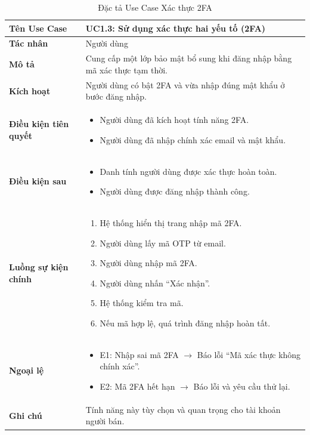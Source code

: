 \begin{table}[H]
\centering
\begin{tabularx}{\textwidth}{|l|X|}
\hline
\textbf{Tên Use Case} & \textbf{UC1.3: Sử dụng xác thực hai yếu tố (2FA)} \\ \hline
\textbf{Tác nhân} & Người dùng \\ \hline
\textbf{Mô tả} & Cung cấp một lớp bảo mật bổ sung khi đăng nhập bằng mã xác thực tạm thời. \\ \hline
\textbf{Kích hoạt} & Người dùng có bật 2FA và vừa nhập đúng mật khẩu ở bước đăng nhập. \\ \hline
\textbf{Điều kiện tiên quyết} & 
\begin{itemize}
    \item Người dùng đã kích hoạt tính năng 2FA.
    \item Người dùng đã nhập chính xác email và mật khẩu.
\end{itemize} \\ \hline
\textbf{Điều kiện sau} & 
\begin{itemize}
    \item Danh tính người dùng được xác thực hoàn toàn.
    \item Người dùng được đăng nhập thành công.
\end{itemize} \\ \hline
\textbf{Luồng sự kiện chính} & 
\begin{enumerate}
    \item Hệ thống hiển thị trang nhập mã 2FA.
    \item Người dùng lấy mã OTP từ email.
    \item Người dùng nhập mã 2FA.
    \item Người dùng nhấn ``Xác nhận''.
    \item Hệ thống kiểm tra mã.
    \item Nếu mã hợp lệ, quá trình đăng nhập hoàn tất.
\end{enumerate} \\ \hline
\textbf{Ngoại lệ} & 
\begin{itemize}
    \item E1: Nhập sai mã 2FA $\rightarrow$ Báo lỗi ``Mã xác thực không chính xác''.
    \item E2: Mã 2FA hết hạn $\rightarrow$ Báo lỗi và yêu cầu thử lại.
\end{itemize} \\ \hline
\textbf{Ghi chú} & Tính năng này tùy chọn và quan trọng cho tài khoản người bán. \\ \hline
\end{tabularx}
\caption{Đặc tả Use Case Xác thực 2FA}
\end{table}

